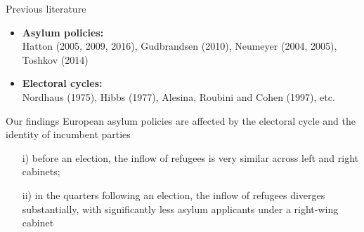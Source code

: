 \documentclass{beamer}
\begin{document}
	\begin{frame}{Previous literature}
\begin{itemize}
\item{\textbf{Asylum policies:}}\\[1ex]
Hatton (2005, 2009, 2016), Gudbrandsen (2010), Neumeyer (2004, 2005), Toshkov (2014)\\[3ex]

\item{\textbf{Electoral cycles:}}\\[1ex]
Nordhaus (1975), Hibbs (1977), Alesina, Roubini and Cohen (1997), etc.\\[3ex]
\end{itemize}
	\end{frame}

    \begin{frame}{Our findings}
European asylum policies are affected by the electoral cycle and the identity of incumbent parties\\[2ex]
\begin{itemize}
\item[i)]{before an election, the inflow of refugees is very similar across left and right cabinets;}\\[1ex]
\item[ii)]{in the quarters following an election, the inflow of refugees diverges substantially, with significantly less asylum applicants under a right-wing cabinet}\\[1ex]
\end{itemize}
	\end{frame}



\end{document}
